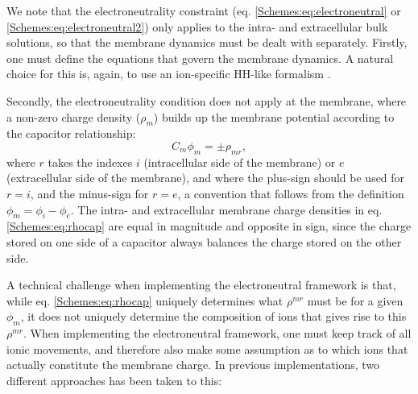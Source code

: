 We note that the electroneutrality constraint (eq. \ref{Schemes:eq:electroneutral} or \ref{Schemes:eq:electroneutral2}) only applies to the intra- and extracellular bulk solutions, so that the membrane dynamics must be dealt with separately. Firstly, one must define the equations that govern the membrane dynamics. A natural choice for this is, again, to use an ion-specific HH-like formalism \citep{Mori2006, Mori2009, Pods2017, ellingsrud2020}. 

Secondly, the electroneutrality condition does not apply at the membrane, where a non-zero charge density ($\rho_{m}$) builds up the membrane potential according to the capacitor relationship:
\begin{equation}
C_m \phi_{m} = \pm \rho_{mr},
\label{Schemes:eq:rhocap}
\end{equation}
where $r$ takes the indexes $i$ (intracellular side of the membrane) or $e$ (extracellular side of the membrane), and where the plus-sign should be used for $r=i$, and the minus-sign for $r=e$, a convention that follows from the definition $\phi_{m} = \phi_{i} - \phi_{e}$. The intra- and extracellular membrane charge densities in eq. \ref{Schemes:eq:rhocap} are equal in magnitude and opposite in sign, since the charge stored on one side of a capacitor always balances the charge stored on the other side. 

A technical challenge when implementing the electroneutral framework is that, while eq. \ref{Schemes:eq:rhocap} uniquely determines what  $\rho^{mr}$ must be for a given $\phi_{m}$, it does not uniquely determine the composition of ions that gives rise to this  $\rho^{mr}$. When implementing the electroneutral framework, one must keep track of all ionic movements, and therefore also make some assumption as to which ions that actually constitute the membrane charge. In previous implementations, two different approaches has been taken to this:

